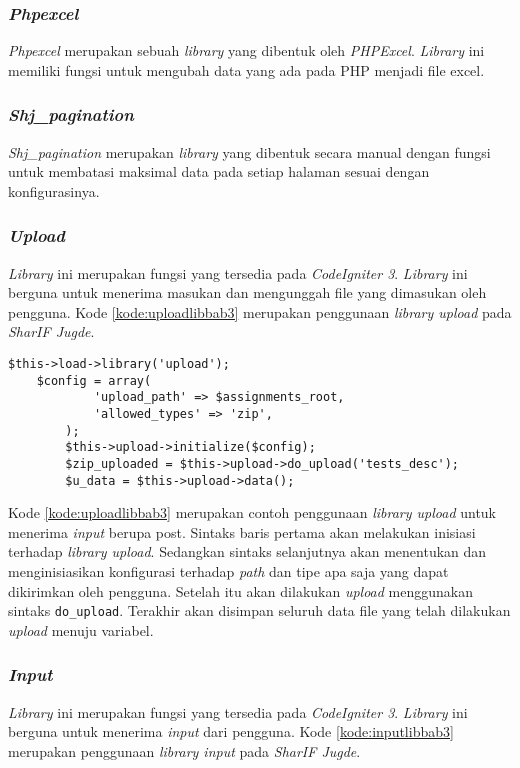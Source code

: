 \subsubsection{\textit{Phpexcel}}
\textit{Phpexcel} merupakan sebuah \textit{library} yang dibentuk oleh \textit{PHPExcel}. \textit{Library} ini memiliki fungsi untuk mengubah data yang ada pada PHP menjadi file excel. 

\subsubsection{\textit{Shj\_pagination}}
\textit{Shj\_pagination} merupakan \textit{library} yang dibentuk secara manual dengan fungsi untuk membatasi maksimal data pada setiap halaman sesuai dengan konfigurasinya.

\subsubsection{\textit{Upload}}
\textit{Library} ini merupakan fungsi yang tersedia pada \textit{CodeIgniter 3}. \textit{Library} ini berguna untuk menerima masukan dan mengunggah file yang dimasukan oleh pengguna. Kode \ref{kode:uploadlibbab3} merupakan penggunaan \textit{library upload} pada \textit{SharIF Jugde}.

\begin{lstlisting}[caption=Contoh penggunaan \textit{library upload}, label=kode:uploadlibbab3]
	$this->load->library('upload');
	$config = array(
			'upload_path' => $assignments_root,
			'allowed_types' => 'zip',
		);
		$this->upload->initialize($config);
		$zip_uploaded = $this->upload->do_upload('tests_desc');
		$u_data = $this->upload->data();
\end{lstlisting}

Kode \ref{kode:uploadlibbab3} merupakan contoh penggunaan \textit{library upload} untuk menerima \textit{input} berupa post. Sintaks baris pertama akan melakukan inisiasi terhadap \textit{library upload}. Sedangkan sintaks selanjutnya akan menentukan dan menginisiasikan konfigurasi terhadap \textit{path} dan tipe apa saja yang dapat dikirimkan oleh pengguna. Setelah itu akan dilakukan \textit{upload} menggunakan sintaks \texttt{do\_upload}. Terakhir akan disimpan seluruh data file yang telah dilakukan \textit{upload} menuju variabel.

\subsubsection{\textit{Input}}
\textit{Library} ini merupakan fungsi yang tersedia pada \textit{CodeIgniter 3}. \textit{Library} ini berguna untuk menerima \textit{input} dari pengguna. Kode \ref{kode:inputlibbab3} merupakan penggunaan \textit{library input} pada \textit{SharIF Jugde}.

